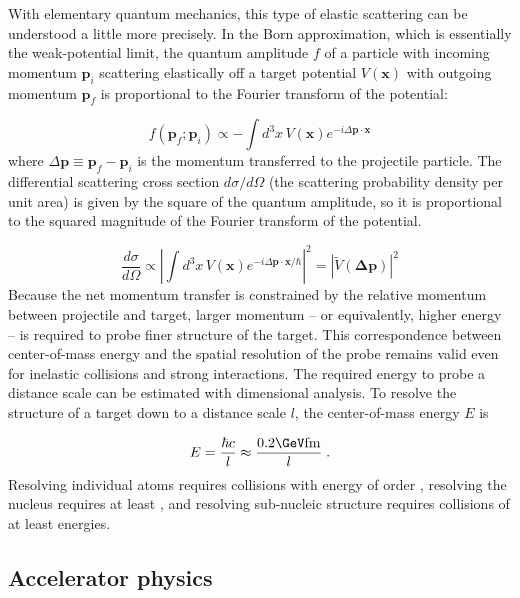With elementary quantum mechanics, this type of elastic scattering can be understood a little more precisely.
In the Born approximation, which is essentially the weak-potential limit, the quantum amplitude $f$ of a particle with incoming momentum $\mathbf{p}_{i}$ scattering elastically off a target potential $V(\mathbf{x})$ with outgoing momentum $\mathbf{p}_{f}$ is proportional to the Fourier transform of the potential:

\begin{equation}
  f\left(\mathbf{p}_f ; \mathbf{p}_i\right) \propto - \int d^3 x \, V(\mathbf{x}) e^{-i \Delta \mathbf{p} \cdot \mathbf{x}}
  \label{eq:born}
\end{equation}
where $\Delta \mathbf{p} \equiv \mathbf{p}_f - \mathbf{p}_i$ is the momentum transferred to the projectile particle.
The differential scattering cross section $d\sigma/d\Omega$ (the scattering probability density per unit area) is given by the square of the quantum amplitude, so it is proportional to the squared magnitude of the Fourier transform of the potential.

\begin{equation}
  \frac{d\sigma}{d\Omega} \propto \left| \int d^3 x \, V(\mathbf{x}) e^{-i \Delta \mathbf{p} \cdot \mathbf{x} / \hbar} \right|^2 = \left| \tilde{V}(\mathbf{\Delta \mathbf{p}}) \right|^2
\end{equation}
Because the net momentum transfer is constrained by the relative momentum between projectile and target, larger momentum -- or equivalently, higher energy -- is required to probe finer structure of the target.
This correspondence between center-of-mass energy and the spatial resolution of the probe remains valid even for inelastic collisions and strong interactions.
The required energy to probe a distance scale can be estimated with dimensional analysis.
To resolve the structure of a target down to a distance scale $l$, the center-of-mass energy $E$ is

\begin{equation}
E = \frac{\hbar c}{l} \approx \frac{0.2 \GeV \fm}{l} \; .
\end{equation}
Resolving individual atoms requires collisions with energy of order \keV, resolving the nucleus requires at least \MeV, and resolving sub-nucleic structure requires collisions of at least \GeV energies.

\subsection{Accelerator physics}

